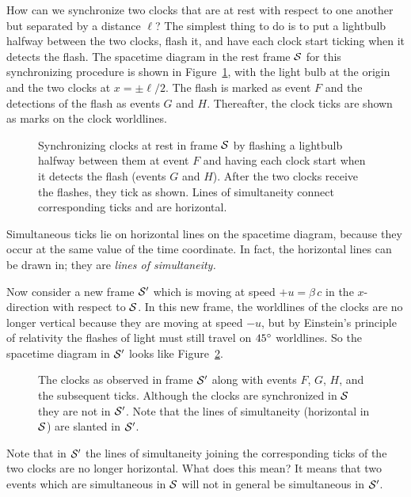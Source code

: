 How can we synchronize two clocks that are at rest with respect to one
another but separated by a distance $\ell$?  The simplest thing to do
is to put a lightbulb halfway between the two clocks, flash it, and
have each clock start ticking when it detects the flash.  The
spacetime diagram in the rest frame $\rfr{S}$ for this synchronizing
procedure is shown in Figure~\ref{fig:synch}, with the light bulb at
the origin and the two clocks at $x=\pm\ell/2$.  The flash is marked
as event $F$ and the detections of the flash as events $G$ and $H$.
Thereafter, the clock ticks are shown as marks on the clock worldlines.
\begin{figure}
\caption[Synchronizing clocks in frame $\rfr{S}$.]{Synchronizing
clocks at rest in frame $\rfr{S}$ by flashing a lightbulb halfway
between them at event $F$ and having each clock start when it detects
the flash (events $G$ and $H$).  After the two clocks receive the
flashes, they tick as shown.  Lines of simultaneity connect
corresponding ticks and are horizontal.}
\label{fig:synch}
\end{figure}
Simultaneous ticks lie on horizontal lines on the spacetime diagram,
because they occur at the same value of the time coordinate.  In fact,
the horizontal lines can be drawn in; they are {\em lines of
simultaneity.\/}

Now consider a new frame $\rfr{S'}$ which is moving at speed
$+u=\beta\, c$ in the $x$-direction with respect to $\rfr{S}$.  In
this new frame, the worldlines of the clocks are no longer vertical
because they are moving at speed $-u$, but by Einstein's principle of
relativity the flashes of light must still travel on $45^{\circ}$
worldlines.  So the spacetime diagram in $\rfr{S'}$ looks like
Figure~\ref{fig:synchprime}.
\begin{figure}
\caption[Clocks in frame $\rfr{S'}$ that are synchronized in
$\rfr{S}$.]{The clocks as observed in frame $\rfr{S'}$ along with
events $F$, $G$, $H$, and the subsequent ticks.  Although the clocks
are synchronized in $\rfr{S}$ they are not in $\rfr{S'}$.  Note that
the lines of simultaneity (horizontal in $\rfr{S}$) are slanted in
$\rfr{S'}$.}
\label{fig:synchprime}
\end{figure}
Note that in $\rfr{S'}$ the lines of simultaneity joining the
corresponding ticks of the two clocks are no longer horizontal.  What
does this mean?  It means that two events which are simultaneous in
$\rfr{S}$ will not in general be simultaneous in $\rfr{S'}$.


